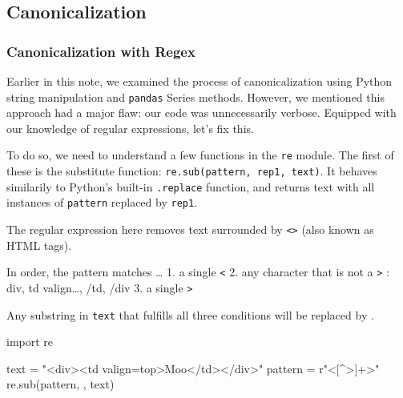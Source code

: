 \documentclass[
  letterpaper,
  DIV=11,
  numbers=noendperiod]{scrreprt}
\newenvironment{Shaded}{\begin{snugshade}}{\end{snugshade}}
\newcommand{\ImportTok}[1]{\textcolor[rgb]{0.00,0.46,0.62}{#1}}
\newcommand{\NormalTok}[1]{\textcolor[rgb]{0.00,0.23,0.31}{#1}}
\newcommand{\OperatorTok}[1]{\textcolor[rgb]{0.37,0.37,0.37}{#1}}
\newcommand{\StringTok}[1]{\textcolor[rgb]{0.13,0.47,0.30}{#1}}
\newcommand{\VerbatimStringTok}[1]{\textcolor[rgb]{0.13,0.47,0.30}{#1}}
\begin{document}
\hypertarget{canonicalization-1}{%
\subsection{Canonicalization}\label{canonicalization-1}}

\hypertarget{canonicalization-with-regex}{%
\subsubsection{Canonicalization with
Regex}\label{canonicalization-with-regex}}

Earlier in this note, we examined the process of canonicalization using
Python string manipulation and \texttt{pandas} Series methods. However,
we mentioned this approach had a major flaw: our code was unnecessarily
verbose. Equipped with our knowledge of regular expressions, let's fix
this.

To do so, we need to understand a few functions in the \texttt{re}
module. The first of these is the substitute function:
\texttt{re.sub(pattern,\ rep1,\ text)}. It behaves similarily to
Python's built-in \texttt{.replace} function, and returns text with all
instances of \texttt{pattern} replaced by \texttt{rep1}.

The regular expression here removes text surrounded by
\texttt{\textless{}\textgreater{}} (also known as HTML tags).

In order, the pattern matches \ldots{} 1. a single \texttt{\textless{}}
2. any character that is not a \texttt{\textgreater{}} : div, td
valign\ldots, /td, /div 3. a single \texttt{\textgreater{}}

Any substring in \texttt{text} that fulfills all three conditions will
be replaced by \texttt{\textquotesingle{}\textquotesingle{}}.

\begin{Shaded}
\begin{Highlighting}[]
\ImportTok{import}\NormalTok{ re}

\NormalTok{text }\OperatorTok{=} \StringTok{"\textless{}div\textgreater{}\textless{}td valign=\textquotesingle{}top\textquotesingle{}\textgreater{}Moo\textless{}/td\textgreater{}\textless{}/div\textgreater{}"}
\NormalTok{pattern }\OperatorTok{=} \VerbatimStringTok{r"\textless{}[\^{}\textgreater{}]+\textgreater{}"}
\NormalTok{re.sub(pattern, }\StringTok{\textquotesingle{}\textquotesingle{}}\NormalTok{, text) }
\end{Highlighting}
\end{Shaded}
\end{document}
